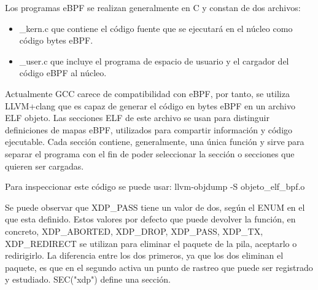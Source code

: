 Los programas eBPF se realizan generalmente en C y constan de dos archivos:
\begin{itemize}
        \item \_kern.c que contiene el código fuente que se ejecutará en el núcleo como código bytes eBPF.
        \item \_user.c que incluye el programa de espacio de usuario y el cargador del código eBPF al núcleo.
\end{itemize}
Actualmente GCC carece de compatibilidad con eBPF, por tanto, se utiliza LLVM+clang que es capaz de generar el código en bytes eBPF en un archivo ELF objeto.
Las secciones ELF de este archivo se usan para distinguir definiciones de mapas eBPF, utilizados para compartir información y código ejecutable. Cada sección contiene, generalmente, una única función y sirve para separar el programa con el fin de poder seleccionar la sección o secciones que quieren ser cargadas.

Para inspeccionar este código se puede usar: llvm-objdump -S objeto\_elf\_bpf.o


Se puede observar que XDP\_PASS tiene un valor de dos, según el ENUM en el que esta definido. Estos valores por defecto que puede devolver la función, en concreto, XDP\_ABORTED, XDP\_DROP, XDP\_PASS, XDP\_TX, XDP\_REDIRECT se utilizan para eliminar el paquete de la pila, aceptarlo o redirigirlo. La diferencia entre los dos primeros, ya que los dos eliminan el paquete, es que en el segundo activa un punto de rastreo que puede ser registrado y estudiado. SEC("xdp") define una sección.

